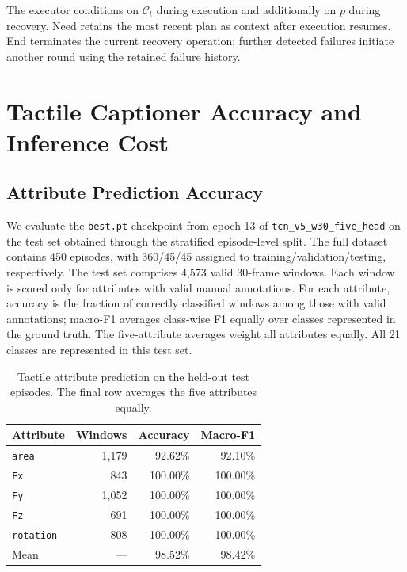 The executor conditions on $\mathcal C_t$ during execution and additionally on $p$ during recovery. Need retains the most recent plan as context after execution resumes. End terminates the current recovery operation; further detected failures initiate another round using the retained failure history.

\section{Tactile Captioner Accuracy and Inference Cost}
\label{sec:app_captioner_evaluation}

\subsection{Attribute Prediction Accuracy}

We evaluate the \texttt{best.pt} checkpoint from epoch 13 of \texttt{tcn\_v5\_w30\_five\_head} on the test set obtained through the stratified episode-level split. The full dataset contains 450 episodes, with 360/45/45 assigned to training/validation/testing, respectively. The test set comprises 4,573 valid 30-frame windows. Each window is scored only for attributes with valid manual annotations. For each attribute, accuracy is the fraction of correctly classified windows among those with valid annotations; macro-F1 averages class-wise F1 equally over classes represented in the ground truth. The five-attribute averages weight all attributes equally. All 21 classes are represented in this test set.

\begin{table}[t]
\centering
\small
\caption{Tactile attribute prediction on the held-out test episodes. The final row averages the five attributes equally.}
\label{tab:app_captioner_accuracy}
\setlength{\tabcolsep}{4pt}
\renewcommand{\arraystretch}{1.12}
\begin{tabularx}{\linewidth}{@{}>{\raggedright\arraybackslash}Xrrr@{}}
\toprule
\textbf{Attribute} & \textbf{Windows} & \textbf{Accuracy} & \textbf{Macro-F1} \\
\midrule
\texttt{area} & 1,179 & 92.62\% & 92.10\% \\
\texttt{Fx} & 843 & 100.00\% & 100.00\% \\
\texttt{Fy} & 1,052 & 100.00\% & 100.00\% \\
\texttt{Fz} & 691 & 100.00\% & 100.00\% \\
\texttt{rotation} & 808 & 100.00\% & 100.00\% \\
\midrule
Mean & --- & 98.52\% & 98.42\% \\
\bottomrule
\end{tabularx}
\end{table}

